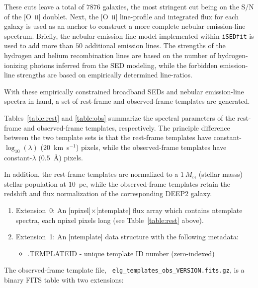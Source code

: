 \documentclass[11pt]{article}
\newcommand{\oii}{[O~{\sc ii}]}
\begin{document}
These cuts leave a total of $7876$ galaxies, the most stringent cut
being on the S/N of the \oii{} doublet.  Next, the \oii{} line-profile
and integrated flux for each galaxy is used as an anchor to construct
a more complete nebular emission-line spectrum.  Briefly, the nebular
emission-line model implemented within {\tt iSEDfit} is used to add
more than $50$ additional emission lines.  The strengths of the
hydrogen and helium recombination lines are based on the number of
hydrogen-ionizing photons inferred from the SED modeling, while the
forbidden emission-line strengths are based on empirically determined
line-ratios.

With these empirically constrained broadband SEDs and nebular
emission-line spectra in hand, a set of rest-frame and observed-frame
templates are generated.  

Tables~\ref{table:rest} and \ref{table:obs} summarize the spectral parameters of
the rest-frame and observed-frame templates, respectively.  The principle
difference between the two template sets is that the rest-frame templates have
constant-$\log_{10}(\lambda)$ ($20$~km~s$^{-1}$) pixels, while the
observed-frame templates have constant-$\lambda$ ($0.5$~\AA) pixels.  

In addition, the rest-frame templates are normalized to a $1~M_{\odot}$ (stellar
masss) stellar population at $10$~pc, while the observed-frame templates retain
the redshift and flux normalization of the corresponding DEEP2 galaxy.


\begin{enumerate}
\item{Extension~0: An [{\sc npixel}]$\times$[{\sc ntemplate}] flux
  array which contains {\sc ntemplate} spectra, each {\sc npixel}
  pixels long (see Table~\ref{table:rest} above).}
\item{Extension~1: An [{\sc ntemplate}] data structure with the
  following metadata:
\begin{itemize}
\item{.{\sc TEMPLATEID} - unique template ID number (zero-indexed)}
\end{itemize}
}
\end{enumerate}

The observed-frame template file, {\tt
  elg\_templates\_obs\_VERSION.fits.gz}, is a binary FITS table with
two extensions:
\end{document}
